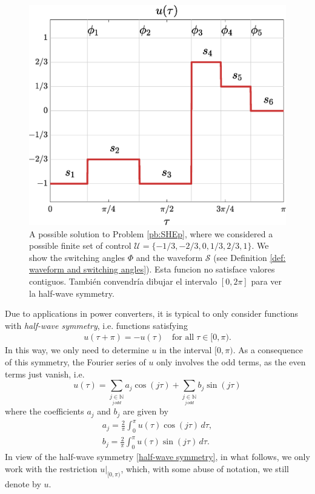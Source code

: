 \documentclass[twocolumn]{autart}    %
\begin{document}
\begin{figure}
	\centering
	\includegraphics[scale=0.35]{img/fig01.eps} 
	\caption{A possible solution to Problem \ref{pb:SHEp}, where we considered a possible finite set of control $\mathcal{U} = \{-1/3, -2/3, 0, 1/3, 2/3, 1\}$. We show the switching angles $\Phi$ and the waveform $\mathcal{S}$ (see Definition \ref{def: waveform and switching angles}).{\color{red} Esta funcion no satisface valores contiguos. También convendría dibujar el intervalo $[0,2\pi]$ para ver la half-wave symmetry. } }
	\label{fig:exampleSHE}
\end{figure}

Due to applications in power converters,  it is typical to only consider functions with \textit{half-wave symmetry}, i.e.  functions satisfying
\begin{align}\label{half-wave symmetry}
	u(\tau + \pi) = -u(\tau)\quad \mbox{for all}\; \tau \in [0,\pi).
\end{align}
In this way, we only need to determine $u$ in the interval $[0,\pi)$.
As a consequence of this symmetry, the Fourier series of $u$ only involves the odd terms, as the even terms just vanish, i.e.
\begin{equation}
	u(\tau ) = \sum_{\underset{j\, odd}{j \in \mathbb{N}}} a_j \cos(j\tau)+ \sum_{\underset{j\, odd}{j \in \mathbb{N}}}  b_j \sin(j \tau)
\end{equation}
where the coefficients $a_j$ and $b_j$ are given by
\begin{equation} \label{eq:an}
	\begin{aligned}
		a_j = \frac{2}{\pi} \int_0^\pi u(\tau ) \cos(j \tau)\,d\tau, 
		\\
		b_j = \frac{2}{\pi} \int_0^\pi u(\tau)  \sin(j \tau)\,d\tau.
	\end{aligned}
\end{equation}
In view of the half-wave symmetry \eqref{half-wave symmetry}, in what follows, we only work with the restriction $u|_{[0,\pi)}$, which, with some abuse of notation, we still denote by $u$. 
\end{document}

